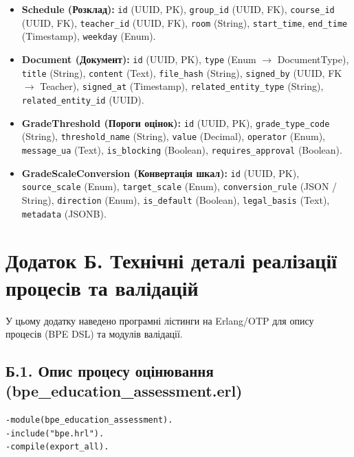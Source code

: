 \documentclass{article}
\begin{document}
\begin{appendix}
\begin{itemize}
    \item \textbf{Schedule (Розклад):} \texttt{id} (UUID, PK), \texttt{group\_id} (UUID, FK), \texttt{course\_id} (UUID, FK), \texttt{teacher\_id} (UUID, FK), \texttt{room} (String), \texttt{start\_time}, \texttt{end\_time} (Timestamp), \texttt{weekday} (Enum).
    \item \textbf{Document (Документ):} \texttt{id} (UUID, PK), \texttt{type} (Enum $\rightarrow$ DocumentType), \texttt{title} (String), \texttt{content} (Text), \texttt{file\_hash} (String), \texttt{signed\_by} (UUID, FK $\rightarrow$ Teacher), \texttt{signed\_at} (Timestamp), \texttt{related\_entity\_type} (String), \texttt{related\_entity\_id} (UUID).
    \item \textbf{GradeThreshold (Пороги оцінок):} \texttt{id} (UUID, PK), \texttt{grade\_type\_code} (String), \texttt{threshold\_name} (String), \texttt{value} (Decimal), \texttt{operator} (Enum), \texttt{message\_ua} (Text), \texttt{is\_blocking} (Boolean), \texttt{requires\_approval} (Boolean).
    \item \textbf{GradeScaleConversion (Конвертація шкал):} \texttt{id} (UUID, PK), \texttt{source\_scale} (Enum), \texttt{target\_scale} (Enum), \texttt{conversion\_rule} (JSON / String), \texttt{direction} (Enum), \texttt{is\_default} (Boolean), \texttt{legal\_basis} (Text), \texttt{metadata} (JSONB).
\end{itemize}

\newpage
\section{Додаток Б. Технічні деталі реалізації процесів та валідацій}
У цьому додатку наведено програмні лістинги на Erlang/OTP для опису процесів (BPE DSL) та модулів валідації.

\subsection{Б.1. Опис процесу оцінювання (bpe\_education\_assessment.erl)}
\begin{verbatim}
-module(bpe_education_assessment).
-include("bpe.hrl").
-compile(export_all).


\end{verbatim}
\end{appendix}
\end{document}
